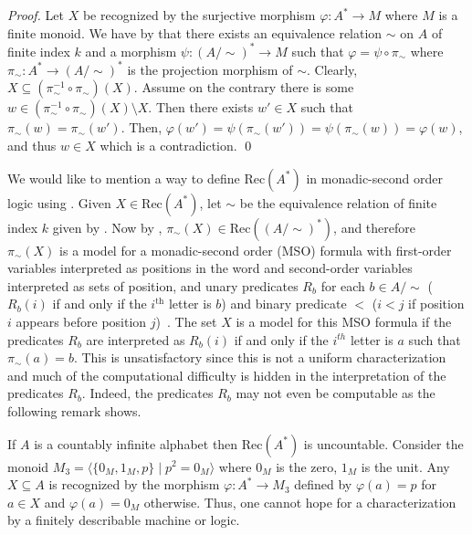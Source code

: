 \documentclass{llncs}
\begin{document}
\begin{proof}
  Let $X$ be recognized by the surjective morphism $\varphi: A^* \to M$ where $M$ is a finite monoid. We have by  that there exists an equivalence relation $\sim$ on $A$ of finite index $k$ and a morphism $\psi: (A/\sim)^* \to M$ such that $\varphi = \psi \circ \pi_\sim$ where $\pi_\sim: A^* \to (A/\sim)^*$ is the projection morphism of $\sim$.
  Clearly, $X \subseteq (\pi_\sim^{-1} \circ \pi_\sim)(X)$. Assume on the contrary there is some $w \in (\pi_\sim^{-1} \circ \pi_\sim)(X) \setminus X$. 
  Then there exists $w' \in X$ such that $\pi_\sim(w) = \pi_\sim(w')$. 
  Then, $\varphi(w') = \psi(\pi_\sim(w')) = \psi(\pi_\sim(w)) = \varphi(w)$, and thus $w \in X$ which is a contradiction.
  \qed
\end{proof}
We would like to mention a way to define $\text{Rec}(A^*)$ in monadic-second order logic using . Given $X \in \text{Rec}(A^*)$, let $\sim$ be the equivalence relation of finite index $k$ given by . Now by , $\pi_\sim(X) \in \text{Rec}((A/\sim)^*)$, and therefore $\pi_\sim(X)$ is a model for a monadic-second order (MSO) formula with first-order variables interpreted as positions in the word and second-order variables interpreted as sets of position, and unary predicates $R_b$ for each $b \in A/\sim$ ($R_b(i)$ if and only if the $i^\text{th}$ letter is $b$) and binary predicate $<$ ($i<j$ if position $i$ appears before position $j$)~\cite{pin2010mathematical}. The set $X$ is a model for this MSO formula if the predicates $R_b$ are interpreted as $R_b(i)$ if and only if the $i^{th}$ letter is $a$ such that $\pi_\sim(a) = b$. This is unsatisfactory since this is not a uniform characterization and much of the computational difficulty is hidden in the interpretation of the predicates $R_b$. Indeed, the predicates $R_b$ may not even be computable as the following remark shows.

\begin{remark}
    If $A$ is a countably infinite alphabet then $\text{Rec}(A^*)$ is uncountable. Consider the monoid $M_3 = \langle \{0_M, 1_M, p\} \mid p^2 = 0_M \rangle$ where $0_M$ is the zero, $1_M$ is the unit. Any $X \subseteq A$ is recognized by the morphism $\varphi: A^* \to M_3$ defined by $\varphi(a) = p$ for $a \in X$ and $\varphi(a) = 0_M$ otherwise. Thus, one cannot hope for a characterization by a finitely describable machine or logic.
    \label{rem:rec-infinite-generated-free-monoid-uncountable}
\end{remark}
\end{document}
